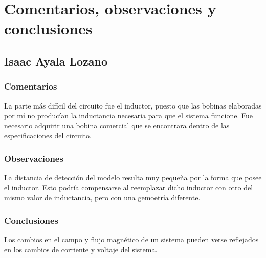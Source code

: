 \section{Comentarios, observaciones y conclusiones}
\subsection{Isaac Ayala Lozano}
\subsubsection{Comentarios}
La parte m\'as dif\'icil del circuito fue el inductor,
puesto que las bobinas elaboradas por m\'i no produc\'ian
la inductancia necesaria para que el sistema funcione.
Fue necesario adquirir una bobina comercial que se encontrara
dentro de las especificaciones del circuito.
\subsubsection{Observaciones}
La distancia de detecci\'on del modelo resulta muy peque\~na
por la forma que posee el inductor. Esto podr\'ia compensarse
al reemplazar dicho inductor con otro del mismo valor de 
inductancia, pero con una gemoetr\'ia diferente.
\subsubsection{Conclusiones}
Los cambios en el campo y flujo magn\'etico de un sistema 
pueden verse reflejados en los cambios de corriente y voltaje 
del sistema.
